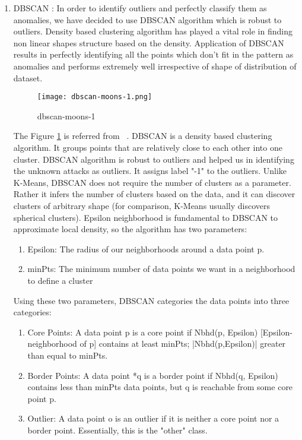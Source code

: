 \documentclass{acm_proc_article-sp}
\begin{document}
\begin{enumerate}
\item DBSCAN : In order to identify outliers and perfectly classify them as anomalies, we have decided to use DBSCAN algorithm which is robust to outliers. Density based clustering algorithm has played a vital role in finding non linear shapes structure based on the density. Application of DBSCAN results in perfectly identifying all the points which don't fit in the pattern as anomalies and performs extremely well irrespective of shape of distribution of dataset.
\begin{figure}[h]
\texttt{[image: dbscan-moons-1.png]}
\centering
\caption{dbscan-moons-1}
\label{dbscan-moons-1}
\end{figure}
The Figure \ref{dbscan-moons-1} is referred from ~\cite{www-dominodatalab}.
DBSCAN is a density based clustering algorithm. It groups points that are relatively close to each other into one cluster. DBSCAN algorithm is robust to outliers and helped us in identifying the unknown attacks as outliers. It assigns label "-1" to the outliers.
Unlike K-Means, DBSCAN does not require the number of clusters as a parameter. Rather it infers the number of clusters based on the data, and it can discover clusters of arbitrary shape (for comparison, K-Means usually discovers spherical clusters). Epsilon neighborhood is fundamental to DBSCAN to approximate local density, so the algorithm has two parameters:
\begin{enumerate}
\item Epsilon: The radius of our neighborhoods around a data point p.
\item minPts: The minimum number of data points we want in a neighborhood to define a cluster
\end{enumerate}

Using these two parameters, DBSCAN categories the data points into three categories:
\begin{enumerate}
\item Core Points: A data point p is a core point if Nbhd(p, Epsilon) [Epsilon-neighborhood of p] contains at least minPts; |Nbhd(p,Epsilon)| greater than equal to minPts.
\item Border Points: A data point *q is a border point if Nbhd(q, Epsilon) contains less than minPts data points, but q is reachable from some core point p.
\item Outlier: A data point o is an outlier if it is neither a core point nor a border point. Essentially, this is the "other" class.
\end{enumerate}


\end{enumerate}
\end{document}

